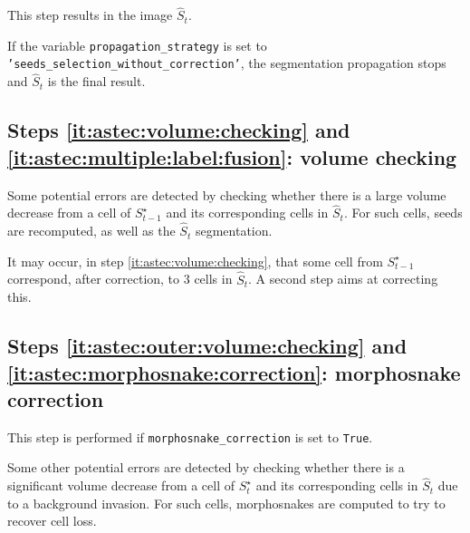 This step results in the image $\hat{S}_{t}$.

If the variable \texttt{propagation\_strategy} is set to 
\texttt{'seeds\_selection\_without\_correction'}, 
the segmentation propagation stops and $\hat{S}_{t}$ is the final result. 


\subsection{Steps \ref{it:astec:volume:checking} and \ref{it:astec:multiple:label:fusion}: volume checking}

Some potential errors are detected by checking whether there is a large volume decrease from a cell of $S^\star_{t-1}$ and its corresponding cells in $\hat{S}_{t}$. For such cells, seeds are recomputed, as well as the $\hat{S}_{t}$ segmentation.

It may occur, in step \ref{it:astec:volume:checking}, that some cell from $S^\star_{t-1}$ correspond, after correction, to 3 cells in $\hat{S}_{t}$. A second step aims at correcting this.

\subsection{Steps \ref{it:astec:outer:volume:checking} and \ref{it:astec:morphosnake:correction}: morphosnake correction}

This step is performed if \texttt{morphosnake\_correction} is set to \texttt{True}.

Some other potential errors are detected by checking whether there is a significant volume decrease from a cell of $S^\star_t$ and its corresponding cells in $\hat{S}_{t}$ due to a background invasion. For such cells, morphosnakes \cite{marquez-neil:pami:2014} are computed to try to recover cell loss.




